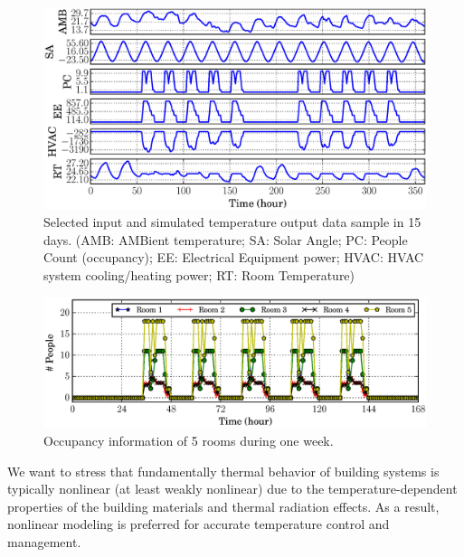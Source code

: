 \begin{figure}[t]
    \includegraphics[width=0.9\columnwidth]{figs/energyplus_review/energyplus}
    \caption{Selected \EP{} input and simulated temperature output data sample in
        15 days.  (AMB: AMBient temperature; SA: Solar Angle; PC: People Count
        (occupancy); EE: Electrical Equipment power; HVAC: HVAC system
        cooling/heating power; RT: Room Temperature)}
    \label{fig:energyplus-io-curve}
\end{figure}
\begin{figure}[t]
\centering
\includegraphics[width=0.9\columnwidth]{figs/energyplus_review/occupancy}
\caption{Occupancy information of 5 rooms during one week.}
\label{fig:occupancy-curve}
\end{figure}

%

We want to stress that fundamentally thermal behavior of building
systems is typically nonlinear (at least weakly nonlinear) due to the
temperature-dependent properties of the building materials and thermal
radiation effects. As a
result, nonlinear modeling is preferred for accurate temperature
control and management.

